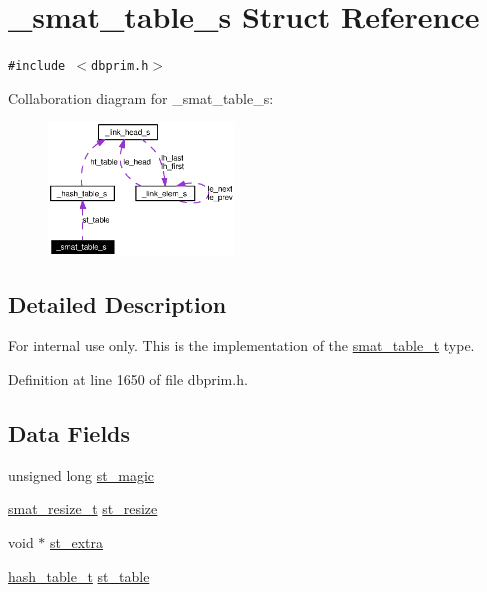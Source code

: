 \hypertarget{struct__smat__table__s}{
\section{\_\-smat\_\-table\_\-s Struct Reference}
\label{struct__smat__table__s}
}
{\tt \#include $<$dbprim.h$>$}

Collaboration diagram for \_\-smat\_\-table\_\-s:\begin{figure}[H]
\begin{center}
\leavevmode
\includegraphics[width=140pt]{struct__smat__table__s__coll__graph}
\end{center}
\end{figure}


\subsection{Detailed Description}
\begin{Desc}
\item[For internal use only.]
This is the implementation of the \hyperlink{group__dbprim__smat_ga0}{smat\_\-table\_\-t} type.\end{Desc}




Definition at line 1650 of file dbprim.h.\subsection*{Data Fields}
\begin{CompactItemize}
\item 
unsigned long \hyperlink{struct__smat__table__s_o0}{st\_\-magic}
\item 
\hyperlink{group__dbprim__smat_ga3}{smat\_\-resize\_\-t} \hyperlink{struct__smat__table__s_o1}{st\_\-resize}
\item 
void $\ast$ \hyperlink{struct__smat__table__s_o2}{st\_\-extra}
\item 
\hyperlink{struct__hash__table__s}{hash\_\-table\_\-t} \hyperlink{struct__smat__table__s_o3}{st\_\-table}
\end{CompactItemize}


